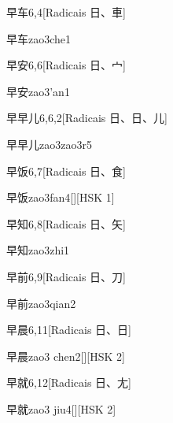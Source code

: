 \begin{entry}{早车}{6,4}[Radicais ⽇、⾞]
  \begin{phonetics}{早车}{zao3che1}
  \end{phonetics}
\end{entry}

\begin{entry}{早安}{6,6}[Radicais ⽇、⼧]
  \begin{phonetics}{早安}{zao3'an1}
  \end{phonetics}
\end{entry}

\begin{entry}{早早儿}{6,6,2}[Radicais ⽇、⽇、⼉]
  \begin{phonetics}{早早儿}{zao3zao3r5}
  \end{phonetics}
\end{entry}

\begin{entry}{早饭}{6,7}[Radicais ⽇、⾷]
  \begin{phonetics}{早饭}{zao3fan4}[][HSK 1]
  \end{phonetics}
\end{entry}

\begin{entry}{早知}{6,8}[Radicais ⽇、⽮]
  \begin{phonetics}{早知}{zao3zhi1}
  \end{phonetics}
\end{entry}

\begin{entry}{早前}{6,9}[Radicais ⽇、⼑]
  \begin{phonetics}{早前}{zao3qian2}
  \end{phonetics}
\end{entry}

\begin{entry}{早晨}{6,11}[Radicais ⽇、⽇]
  \begin{phonetics}{早晨}{zao3 chen2}[][HSK 2]
  \end{phonetics}
\end{entry}

\begin{entry}{早就}{6,12}[Radicais ⽇、⼪]
  \begin{phonetics}{早就}{zao3 jiu4}[][HSK 2]
  \end{phonetics}
\end{entry}

